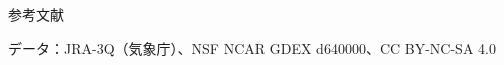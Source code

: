 \begin{frame}[plain]{}
  \vskip 5mm
  {\heavyfont\fontsize{13}{16}\selectfont\color{wcText}参考文献\par}
  \vskip 2mm
  \printrefs
  \vskip 1mm
  {\fontsize{8.5}{10.5}\selectfont\color{wcSecondary}データ：JRA-3Q（気象庁）、NSF NCAR GDEX d640000、CC BY-NC-SA 4.0\par}
\end{frame}
